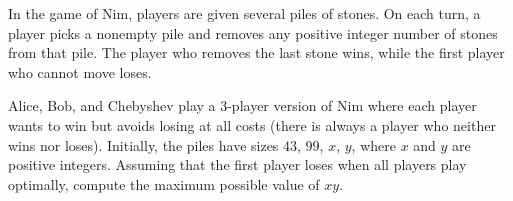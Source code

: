 In the game of Nim, players are given several piles of stones. On each turn, a player picks a nonempty pile and removes any positive integer number of stones from that pile. The player who removes the last stone wins, while the first player who cannot move loses.

Alice, Bob, and Chebyshev play a 3-player version of Nim where each player wants to win but avoids losing at all costs (there is always a player who neither wins nor loses). Initially, the piles have sizes $43$, $99$, $x$, $y$, where $x$ and $y$ are positive integers. Assuming that the first player loses when all players play optimally, compute the maximum possible value of $xy$.
